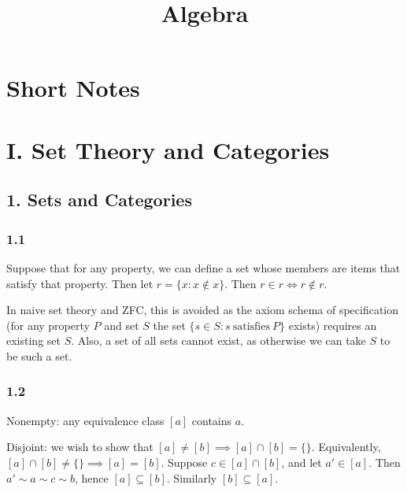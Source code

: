 \documentclass{article}
\title{Algebra}
\date{}
\begin{document}
\maketitle

\section*{Short Notes}


\section*{I. Set Theory and Categories}

\subsection*{1. Sets and Categories}

\subsubsection*{1.1}

Suppose that for any property, we can define a set whose members are items that satisfy that property. Then let $r = \{x : x \not\in x\}$. Then $r \in r \iff r \not\in r$.

In naive set theory and ZFC, this is avoided as the axiom schema of specification (for any property $P$ and set $S$ the set $\{s \in S : s\ \text{satisfies}\ P\}$ exists) requires an existing set $S$. Also, a set of all sets cannot exist, as otherwise we can take $S$ to be such a set.

\subsubsection*{1.2}

Nonempty: any equivalence class $[a]$ contains $a$.

Disjoint: we wish to show that $[a] \ne [b] \implies [a] \cap [b] = \{\}$. Equivalently, $[a] \cap [b] \ne \{\} \implies [a] = [b]$. Suppose $c \in [a] \cap [b]$, and let $a' \in [a]$. Then $a' \sim a \sim c \sim b$, hence $[a] \subseteq [b]$. Similarly $[b] \subseteq [a]$.
\end{document}
